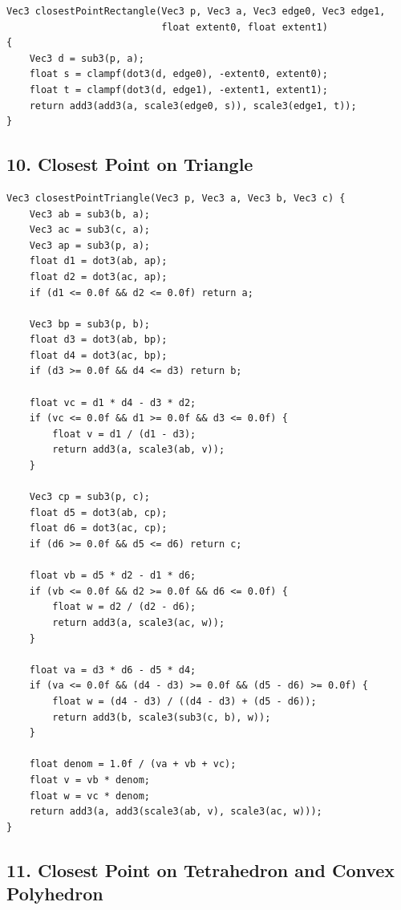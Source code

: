 \documentclass[10pt,letterpaper]{article}
\begin{document}
\begin{verbatim}
Vec3 closestPointRectangle(Vec3 p, Vec3 a, Vec3 edge0, Vec3 edge1,
                           float extent0, float extent1)
{
    Vec3 d = sub3(p, a);
    float s = clampf(dot3(d, edge0), -extent0, extent0);
    float t = clampf(dot3(d, edge1), -extent1, extent1);
    return add3(add3(a, scale3(edge0, s)), scale3(edge1, t));
}
\end{verbatim}


\subsection*{10. Closest Point on Triangle}

\begin{verbatim}
Vec3 closestPointTriangle(Vec3 p, Vec3 a, Vec3 b, Vec3 c) {
    Vec3 ab = sub3(b, a);
    Vec3 ac = sub3(c, a);
    Vec3 ap = sub3(p, a);
    float d1 = dot3(ab, ap);
    float d2 = dot3(ac, ap);
    if (d1 <= 0.0f && d2 <= 0.0f) return a;

    Vec3 bp = sub3(p, b);
    float d3 = dot3(ab, bp);
    float d4 = dot3(ac, bp);
    if (d3 >= 0.0f && d4 <= d3) return b;

    float vc = d1 * d4 - d3 * d2;
    if (vc <= 0.0f && d1 >= 0.0f && d3 <= 0.0f) {
        float v = d1 / (d1 - d3);
        return add3(a, scale3(ab, v));
    }

    Vec3 cp = sub3(p, c);
    float d5 = dot3(ab, cp);
    float d6 = dot3(ac, cp);
    if (d6 >= 0.0f && d5 <= d6) return c;

    float vb = d5 * d2 - d1 * d6;
    if (vb <= 0.0f && d2 >= 0.0f && d6 <= 0.0f) {
        float w = d2 / (d2 - d6);
        return add3(a, scale3(ac, w));
    }

    float va = d3 * d6 - d5 * d4;
    if (va <= 0.0f && (d4 - d3) >= 0.0f && (d5 - d6) >= 0.0f) {
        float w = (d4 - d3) / ((d4 - d3) + (d5 - d6));
        return add3(b, scale3(sub3(c, b), w));
    }

    float denom = 1.0f / (va + vb + vc);
    float v = vb * denom;
    float w = vc * denom;
    return add3(a, add3(scale3(ab, v), scale3(ac, w)));
}
\end{verbatim}


\subsection*{11. Closest Point on Tetrahedron and Convex Polyhedron}
\end{document}
